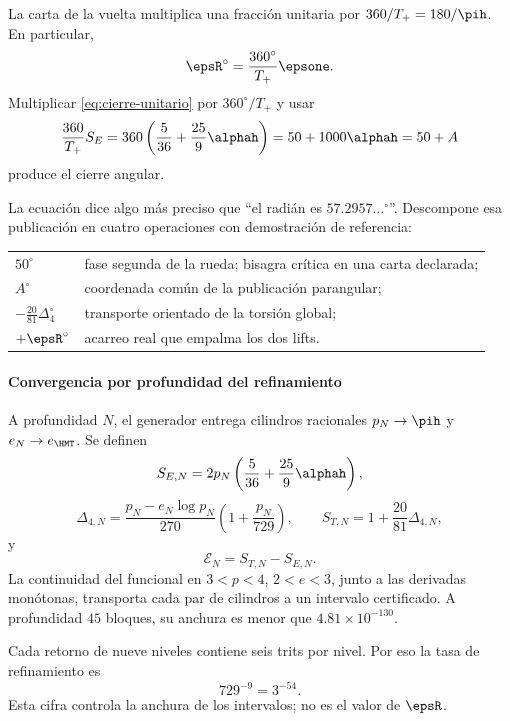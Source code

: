 La carta de la vuelta multiplica una fracción unitaria por
\(360/T_+=180/\pih\). En particular,
\[
\epsR^\circ=\frac{360^\circ}{T_+}\epsone.
\]
Multiplicar \eqref{eq:cierre-unitario} por \(360^\circ/T_+\) y usar
\[
\frac{360}{T_+}S_E
=360\left(\frac5{36}+\frac{25}{9}\alphah\right)
=50+1000\alphah=50+A
\]
produce el cierre angular.

\begin{theorem}
\BigRadionEquation
\end{theorem}

La ecuación dice algo más preciso que \enquote{el radián es
\(57.2957\ldots{}^\circ\)}. Descompone esa publicación en cuatro operaciones
con demostración de referencia:
\begin{center}
\begin{tabularx}{.96\textwidth}{>{\bfseries}l X}
\toprule
\(50^\circ\) & fase segunda de la rueda; bisagra crítica en una carta declarada;\\
\(A^\circ\) & coordenada común de la publicación parangular;\\
\(-\frac{20}{81}\Delta_4^\circ\) & transporte orientado de la torsión global;\\
\(+\epsR^\circ\) & acarreo real que empalma los dos lifts.\\
\bottomrule
\end{tabularx}
\end{center}

\paragraph{Convergencia por profundidad del refinamiento}

A profundidad \(N\), el generador entrega cilindros racionales
\(p_N\to\pih\) y \(e_N\to e_{\HMT}\). Se definen
\[
S_{E,N}=2p_N\left(\frac5{36}+\frac{25}{9}\alphah\right),
\]
\[
\Delta_{4,N}=\frac{p_N-e_N\log p_N}{270}
\left(1+\frac{p_N}{729}\right),\qquad
S_{T,N}=1+\frac{20}{81}\Delta_{4,N},
\]
y
\[
\mathcal E_N=S_{T,N}-S_{E,N}.
\]
La continuidad del funcional en \(3<p<4\), \(2<e<3\), junto a las
derivadas monótonas, transporta cada par de cilindros a un intervalo
certificado. A profundidad \(45\) bloques, su anchura es menor que
\(4.81\times10^{-130}\).

Cada retorno de nueve niveles contiene seis trits por nivel. Por eso la tasa
de refinamiento es
\begin{equation}
729^{-9}=3^{-54}.
\label{eq:contraccion-54}
\end{equation}
Esta cifra controla la anchura de los intervalos; no es el valor de
\(\epsR\).

